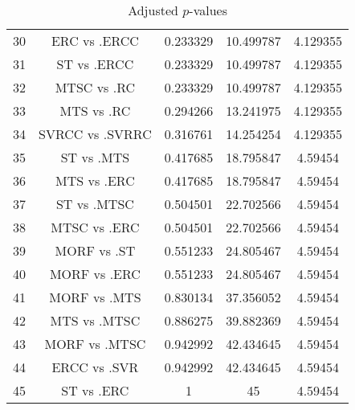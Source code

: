 \documentclass[a4paper,10pt]{article}
\begin{document}
\begin{landscape}
\begin{table}[!htp]
\begin{tabular}{ccccc}
30&ERC vs .ERCC&0.233329&10.499787&4.129355\\
31&ST vs .ERCC&0.233329&10.499787&4.129355\\
32&MTSC vs .RC&0.233329&10.499787&4.129355\\
33&MTS vs .RC&0.294266&13.241975&4.129355\\
34&SVRCC vs .SVRRC&0.316761&14.254254&4.129355\\
35&ST vs .MTS&0.417685&18.795847&4.59454\\
36&MTS vs .ERC&0.417685&18.795847&4.59454\\
37&ST vs .MTSC&0.504501&22.702566&4.59454\\
38&MTSC vs .ERC&0.504501&22.702566&4.59454\\
39&MORF vs .ST&0.551233&24.805467&4.59454\\
40&MORF vs .ERC&0.551233&24.805467&4.59454\\
41&MORF vs .MTS&0.830134&37.356052&4.59454\\
42&MTS vs .MTSC&0.886275&39.882369&4.59454\\
43&MORF vs .MTSC&0.942992&42.434645&4.59454\\
44&ERCC vs .SVR&0.942992&42.434645&4.59454\\
45&ST vs .ERC&1&45&4.59454\\
\hline
\end{tabular}
\caption{Adjusted $p$-values}
\end{table}

\end{landscape}
\end{document}
